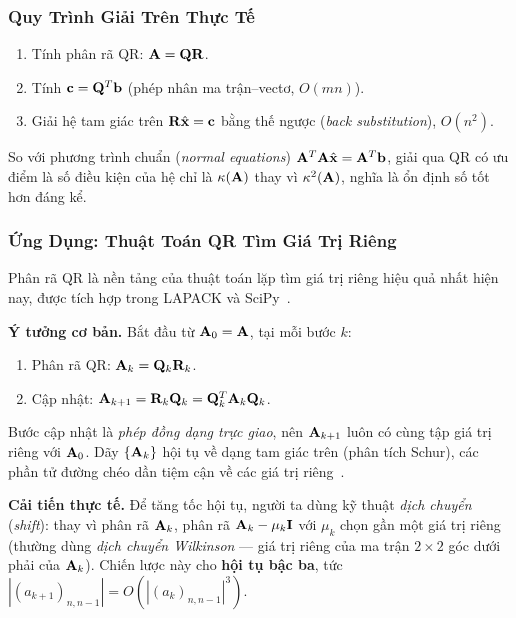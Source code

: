 \subsubsection{Quy Trình Giải Trên Thực Tế}

\begin{enumerate}
    \item Tính phân rã QR: $\mathbf{A} = \mathbf{Q}\mathbf{R}$.
    \item Tính $\mathbf{c} = \mathbf{Q}^T\mathbf{b}$ (phép nhân ma trận--vectơ, $O(mn)$).
    \item Giải hệ tam giác trên $\mathbf{R}\hat{\mathbf{x}} = \mathbf{c}$ bằng thế ngược
          (\textit{back substitution}), $O(n^2)$.
\end{enumerate}

\noindent
So với phương trình chuẩn (\textit{normal equations}) $\mathbf{A}^T\mathbf{A}\hat{\mathbf{x}} = \mathbf{A}^T\mathbf{b}$,
giải qua QR có ưu điểm là số điều kiện của hệ chỉ là $\kappa(\mathbf{A})$ thay vì
$\kappa^2(\mathbf{A})$, nghĩa là ổn định số tốt hơn đáng kể.


\subsubsection{Ứng Dụng: Thuật Toán QR Tìm Giá Trị Riêng}

Phân rã QR là nền tảng của thuật toán lặp tìm giá trị riêng hiệu quả nhất hiện nay,
được tích hợp trong LAPACK và SciPy~\cite{golub2013}.

\textbf{Ý tưởng cơ bản.} Bắt đầu từ $\mathbf{A}_0 = \mathbf{A}$, tại mỗi bước $k$:
\begin{enumerate}[noitemsep]
    \item Phân rã QR: $\mathbf{A}_k = \mathbf{Q}_k\mathbf{R}_k$.
    \item Cập nhật: $\mathbf{A}_{k+1} = \mathbf{R}_k\mathbf{Q}_k = \mathbf{Q}_k^T\mathbf{A}_k\mathbf{Q}_k$.
\end{enumerate}
Bước cập nhật là \emph{phép đồng dạng trực giao}, nên $\mathbf{A}_{k+1}$ luôn có cùng
tập giá trị riêng với $\mathbf{A}_0$. Dãy $\{\mathbf{A}_k\}$ hội tụ về dạng tam giác trên
(phân tích Schur), các phần tử đường chéo dần tiệm cận về các giá trị riêng~\cite{trefethen1997}.

\textbf{Cải tiến thực tế.} Để tăng tốc hội tụ, người ta dùng kỹ thuật \emph{dịch
chuyển} (\textit{shift}): thay vì phân rã $\mathbf{A}_k$, phân rã
$\mathbf{A}_k - \mu_k\mathbf{I}$ với $\mu_k$ chọn gần một giá trị riêng (thường dùng
\textit{dịch chuyển Wilkinson} — giá trị riêng của ma trận $2\times 2$ góc dưới
phải của $\mathbf{A}_k$). Chiến lược này cho \textbf{hội tụ bậc ba}, tức
$|(a_{k+1})_{n,n-1}| = O(|(a_k)_{n,n-1}|^3)$.

